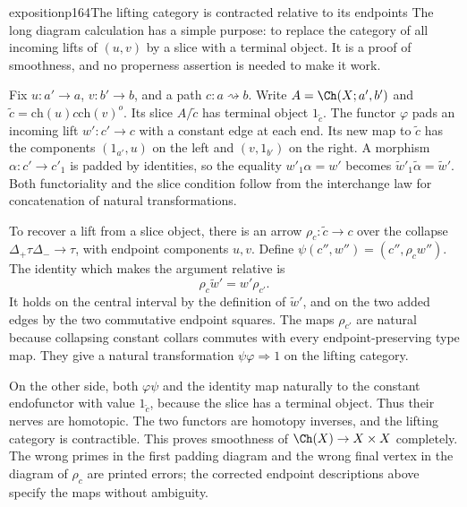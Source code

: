 \begin{dcomment}{exposition}{p164}{The lifting category is contracted relative to its endpoints}
The long diagram calculation has a simple purpose: to replace the category of all incoming lifts of $(u,v)$ by a slice with a terminal object. It is a proof of smoothness, and no properness assertion is needed to make it work.

Fix $u:a'\to a$, $v:b'\to b$, and a path $c:a\rightsquigarrow b$. Write $A=\Ch(X;a',b')$ and $\widetilde c=\mathrm{ch}(u)c\mathrm{ch}(v)^o$. Its slice $A/\widetilde c$ has terminal object $1_{\widetilde c}$. The functor $\varphi$ pads an incoming lift $w':c'\to c$ with a constant edge at each end. Its new map to $\widetilde c$ has the components $(1_{a'},u)$ on the left and $(v,1_{b'})$ on the right. A morphism $\alpha:c'\to c'_1$ is padded by identities, so the equality $w'_1\alpha=w'$ becomes $\widetilde w'_1\widetilde\alpha=\widetilde w'$. Both functoriality and the slice condition follow from the interchange law for concatenation of natural transformations.

To recover a lift from a slice object, there is an arrow $\rho_c:\widetilde c\to c$ over the collapse $\Delta_+\tau\Delta_-\to\tau$, with endpoint components $u,v$. Define $\psi(c'',w'')=(c'',\rho_cw'')$. The identity which makes the argument relative is
\[
 \rho_c\widetilde w'=w'\rho_{c'}.
\]
It holds on the central interval by the definition of $\widetilde w'$, and on the two added edges by the two commutative endpoint squares. The maps $\rho_{c'}$ are natural because collapsing constant collars commutes with every endpoint-preserving type map. They give a natural transformation $\psi\varphi\Rightarrow1$ on the lifting category.

On the other side, both $\varphi\psi$ and the identity map naturally to the constant endofunctor with value $1_{\widetilde c}$, because the slice has a terminal object. Thus their nerves are homotopic. The two functors are homotopy inverses, and the lifting category is contractible. This proves smoothness of $\Ch(X)\to X\times X$ completely. The wrong primes in the first padding diagram and the wrong final vertex in the diagram of $\rho_c$ are printed errors; the corrected endpoint descriptions above specify the maps without ambiguity.
\end{dcomment}

